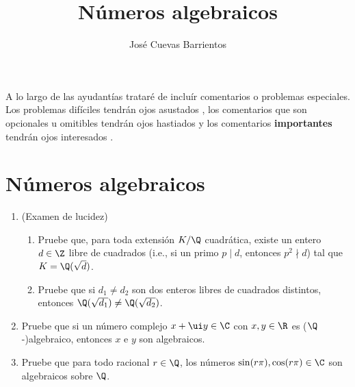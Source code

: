 \documentclass[11pt, reqno]{amsart}
\title{Números algebraicos}
\date{\DTMdate{2025-03-13}}
\author{José Cuevas Barrientos}
\begin{document}
\maketitle

A lo largo de las ayudantías trataré de incluír comentarios o problemas especiales.
Los problemas difíciles tendrán ojos asustados {\straighteyes},
los comentarios que son opcionales u omitibles tendrán ojos hastiados {\upeyes}
y los comentarios \textbf{importantes} tendrán ojos interesados {\righteyes}.

\section{Números algebraicos}
\begin{enumerate}
	\item (Examen de lucidez)
		\begin{enumerate}
			\item Pruebe que, para toda extensión $K/\Q$ cuadrática, existe un entero $d \in \Z$ libre de cuadrados
				(i.e., si un primo $p \mid d$, entonces $p^2 \nmid d$) tal que $K = \Q(\sqrt{d})$.
			\item Pruebe que si $d_1 \ne d_2$ son dos enteros libres de cuadrados distintos, entonces
				$\Q(\sqrt{d_1}) \ne \Q(\sqrt{d_2})$.
		\end{enumerate}

	\item Pruebe que si un número complejo $x + \ui y \in \C$ con $x, y \in \R$ es ($\Q$-)algebraico,
		entonces $x$ e $y$ son algebraicos.

	\item Pruebe que para todo racional $r \in \Q$, los números $\sin(r\pi), \cos(r\pi) \in \C$ son algebraicos sobre $\Q$.


\end{enumerate}
\end{document}
